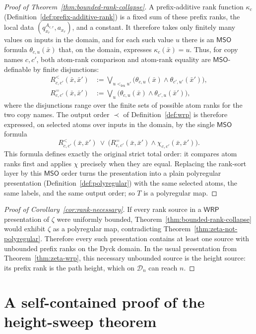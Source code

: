 \documentclass[11pt]{article}
\theoremstyle{definition}
\newcommand{\D}{\mathcal D}
\newcommand{\WRP}{\mathsf{WRP}}
\newcommand{\MSO}{\mathsf{MSO}}
\begin{document}
\begin{proof}[Proof of Theorem~\ref{thm:bounded-rank-collapse}]
A prefix-additive rank function $\kappa_c$
(Definition~\ref{def:prefix-additive-rank}) is a fixed sum of these prefix
ranks, the local data $(q^{A_{c,r}}_{x_r},a_{x_r})$, and a constant.  It
therefore takes only finitely many values on inputs in the domain, and for each
such value $u$ there is an $\MSO$ formula
$\theta_{c,u}(\bar x)$ that, on the domain, expresses
$\kappa_c(\bar x)=u$.  Thus, for copy names $c,c'$, both atom-rank comparison
and atom-rank equality are $\MSO$-definable by finite disjunctions:
\[
\begin{aligned}
 R^{<}_{c,c'}(\bar x,\bar x')
   &:=\bigvee_{u<_{\mathrm{lex}}u'}
      \bigl(\theta_{c,u}(\bar x)\land
             \theta_{c',u'}(\bar x')\bigr),\\
 R^{=}_{c,c'}(\bar x,\bar x')
   &:=\bigvee_u
      \bigl(\theta_{c,u}(\bar x)\land
             \theta_{c',u}(\bar x')\bigr),
\end{aligned}
\]
where the disjunctions range over the finite sets of possible atom ranks for
the two copy names.
The output order $\prec$ of Definition~\ref{def:wrp} is therefore expressed,
on selected atoms over inputs in the domain, by the single $\MSO$ formula
\[
   R^{<}_{c,c'}(\bar x,\bar x')
   \ \lor\
   \bigl(R^{=}_{c,c'}(\bar x,\bar x')\land
          \chi_{c,c'}(\bar x,\bar x')\bigr).
\]
This formula defines exactly the original strict total order: it compares
atom ranks first and applies $\chi$ precisely when they are equal.  Replacing the
rank-sort layer by this $\MSO$ order turns the presentation into a plain
polyregular presentation
(Definition~\ref{def:polyregular}) with the same selected atoms, the same
labels, and the same output order; so $T$ is a polyregular map.
\end{proof}

\begin{proof}[Proof of Corollary~\ref{cor:rank-necessary}]
If every rank source in a $\WRP$ presentation of $\zeta$ were uniformly
bounded, Theorem~\ref{thm:bounded-rank-collapse} would exhibit $\zeta$ as a
polyregular map, contradicting Theorem~\ref{thm:zeta-not-polyregular}.
Therefore every such presentation contains at least one source with unbounded
prefix ranks on the Dyck domain.  In the usual presentation from
Theorem~\ref{thm:zeta-wrp}, this necessary unbounded source is the height
source: its prefix rank is the path height, which on $\D_n$ can reach $n$.
\end{proof}

\section{A self-contained proof of the height-sweep theorem}
\label{app:narayana-sweep-proof}
\end{document}
